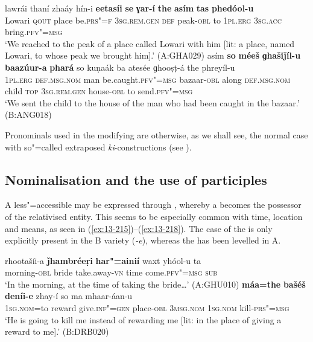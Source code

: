 \ex
\label{ex:13-213}
\gll lawrái thaní zhaáy hín-i    \textbf{eetasíi} \textbf{se} \textbf{ɣar-í} \textbf{the} \textbf{asím} \textbf{tas} \textbf{    phedóol-u}\\
Lowari \textsc{qout} place be.\textsc{prs"=f} \textsc{3sg.rem.gen} \textsc{def} peak-\textsc{obl} to \textsc{1pl.erg} \textsc{3sg.acc} bring.\textsc{pfv"=msg}\\
\glt `We reached to the peak of a place called Lowari with him [lit: a place, named Lowari, to whose peak we brought him].' (A:GHA029)
\ex
\label{ex:13-214}
\gll asím \textbf{so} \textbf{méeš} \textbf{ɡhašiǰíl-u} \textbf{baazúur-a} \textbf{phará} so kuṇaák ba atesée ɡhooṣṭ-á the phreyíl-u\\
\textsc{1pl.erg} \textsc{def.msg.nom} man be.caught.\textsc{pfv"=msg} bazaar-\textsc{obl} along \textsc{def.msg.nom} child \textsc{top} \textsc{3sg.rem.gen} house-\textsc{obl} to send.\textsc{pfv"=msg}\\
\glt `We sent the child to the house of the man who had been caught in the bazaar.' (B:ANG018) 
\z

Pronominals used in the modifying  are otherwise, as we shall see, the normal case with so"=called extraposed \textit{ki}-constructions (see ). 


\subsection{Nominalisation and the use of participles}
\label{subsec:13-6-6}

A less"=accessible   may be expressed through , where\-by a  becomes the possessor of the relativised entity. This seems to be especially common with time, location and means, as seen in (\ref{ex:13-215})--(\ref{ex:13-218}). The  case of the  is only explicitly present in the B variety (\textit{-e}), whereas the  has been levelled in A.

\ea
\label{ex:13-215}
\gll rhootašíi-a \textbf{ǰhambréeṛi} \textbf{har"=ainií} waxt  yhóol-u ta \\
morning-\textsc{obl} bride take.away-\textsc{vn} time come.\textsc{pfv"=msg} \textsc{sub} \\
\glt `In the morning, at the time of taking the bride{\ldots}' (A:GHU010)
\ex
\label{ex:13-216}
\gll \textbf{máa=the} \textbf{bašéš} \textbf{deníi-e} zhay-í so  ma mhaar-áan-u\\
\textsc{1sg.nom}=to reward give.\textsc{inf"=gen} place-\textsc{obl} \textsc{3msg.nom} \textsc{1sg.nom} kill-\textsc{prs"=msg}\\
\glt `He is going to kill me instead of rewarding me [lit: in the place of giving a reward to me].' (B:DRB020)

